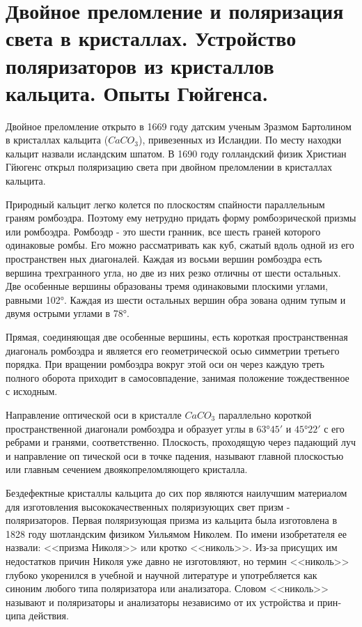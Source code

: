 \section{Двойное преломление и поляризация света в кристаллах. Устройство поляризаторов из кристаллов кальцита. Опыты Гюйгенса.}


Двойное преломление открыто в 1669 году датским ученым
Зразмом Бартолином в кристаллах кальцита ($CaCO_3$), привезенных из Исландии. По месту находки кальцит назвали исландским шпа­том. В 1690 году голландский физик Христиан Гйюгенс открыл
поляризацию света при двойном преломлении в кристаллах кальцита.

Природный кальцит легко колется по плоскостям спайности
параллельным граням ромбоэдра. Поэтому ему нетрудно придать
форму ромбоэрической призмы или ромбоэдра. Ромбоэдр - это шести­
гранник, все шесть граней которого одинаковые ромбы. Его можно
рассматривать как куб, сжатый вдоль одной из его пространствен­
ных диагоналей. Каждая из восьми вершин ромбоэдра есть вершина
трехгранного угла, но две из них резко отличны от шести остальных. Две особенные вершины образованы тремя одинаковыми плоскими углами, равными 102°. Каждая из шести остальных вершин обра­
зована одним тупым и двумя острыми углами в 78°.

Прямая, соединяющая две особенные вершины, есть короткая
пространственная диагональ ромбоэдра и является его геометрической осью симметрии третьего порядка. При вращении ромбоэдра
вокруг этой оси он через каждую треть полного оборота приходит
в самосовпадение, занимая положение тождественное с исходным.

Направление оптической оси в кристалле $CaCO_3$ параллельно короткой пространственной диагонали ромбоэдра и образует углы в $63°45'$ и $45°22'$ с его ребрами и гранями, соответственно.
Плоскость, проходящую через падающий луч и направление оп­
тической оси в точке падения, называют главной плоскостью или
главным сечением двоякопреломляющего кристалла.

Бездефектные кристаллы кальцита до сих пор являются наилучшим материалом для изготовления высококачественных поляризующих
свет призм - поляризаторов. Первая поляризующая призма из кальцита была изготовлена в 1828 году шотландским физиком Уильямом
Николем. По имени изобретателя ее назвали: <<призма Николя>> или
кротко <<николь>>. Из-за присущих им недостатков причин Николя уже
давно не изготовляют, но термин <<николь>> глубоко укоренился в
учебной и научной литературе и употребляется как синоним любого
типа поляризатора или анализатора. Словом <<николь>> называют и
поляризаторы и анализаторы независимо от их устройства и прин­ципа действия.


